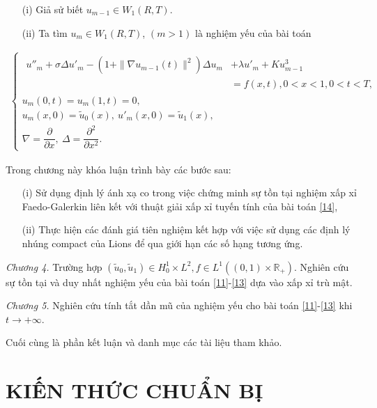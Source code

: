 \documentclass[12pt,a4paper]{article}
\def\R{\mathbb{R}}
\theoremstyle{definition}
\theoremstyle{definition}
\begin{document}
\begin{enumerate}
    \item[(i)] Giả sử biết $u_{m-1} \in W_1(R,T)$.
    \item[(ii)] Ta tìm $u_m \in W_1(R,T)$, $(m > 1)$ là nghiệm yếu của bài toán
\end{enumerate}

\begin{align} \label{14}
\begin{cases}
    \begin{aligned}
        u''_m + \sigma \Delta u'_m - \left(1 + \|\nabla u_{m-1}(t)\|^2\right) \Delta u_m &+ \lambda u'_m + Ku^3_{m-1} \\
        &= f(x,t), 0 < x < 1, 0 < t < T,
    \end{aligned} \\
    u_m(0,t) = u_m(1,t) = 0, \\
    u_m(x,0) = \tilde{u}_0(x), \: u'_m(x,0) = \tilde{u}_1(x), \\
    \nabla = \dfrac{\partial}{\partial x}, \: \Delta = \dfrac{\partial^2}{\partial x^2}.
\end{cases}
\end{align}

Trong chương này khóa luận trình bày các bước sau:
\begin{enumerate}
    \item[(i)] Sử dụng định lý ánh xạ co trong việc chứng minh sự tồn tại nghiệm xấp xỉ Faedo-Galerkin liên kết với thuật giải xấp xỉ tuyến tính của bài toán \eqref{14},
    \item[(ii)] Thực hiện các đánh giá tiên nghiệm kết hợp với việc sử dụng các định lý nhúng compact của Lions để qua giới hạn các số hạng tương ứng.
\end{enumerate}

\textit{Chương 4.} Trường hợp $(\tilde{u}_0, \tilde{u}_1) \in H^1_0 \times L^2, f \in L^1((0,1) \times \R_+)$. Nghiên cứu sự tồn tại và duy nhất nghiệm yếu của bài toán \eqref{11}-\eqref{13} dựa vào xấp xỉ trù mật.

\textit{Chương 5.} Nghiên cứu tính tắt dần mũ của nghiệm yếu cho bài toán \eqref{11}-\eqref{13} khi $t \to +\infty$.

Cuối cùng là phần kết luận và danh mục các tài liệu tham khảo.
\newpage

\section[Kiến thức chuẩn bị]{KIẾN THỨC CHUẨN BỊ}
\end{document}
